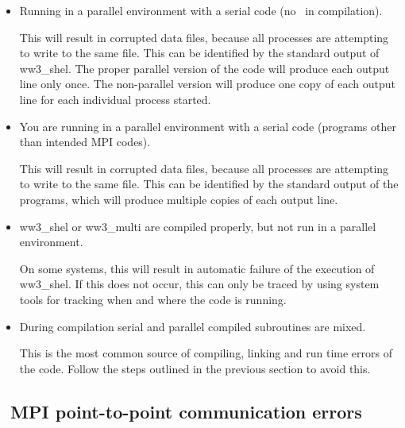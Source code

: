 \begin{itemize}
\item Running in a parallel environment with a serial code (no
      \mpi\ in compilation). \\ \vspace{-3mm}

   This will result in corrupted data files, because all processes are
   attempting to write to the same file. This can be identified by the
   standard output of {\file ww3\_shel}. The proper parallel version of the
   code will produce each output line only once. The non-parallel version will
   produce one copy of each output line for each individual process started.

\item You are running in a parallel environment with a serial code (programs
   other than intended MPI codes). \\ \vspace{-3mm}

   This will result in corrupted data files, because all processes are
   attempting to write to the same file. This can be identified by the
   standard output of the programs, which will produce multiple copies of each
   output line.

\item {\file ww3\_shel} or {\file ww3\_multi} are compiled properly, but not
   run in a parallel environment. \\ \vspace{-3mm}

   On some systems, this will result in automatic failure of the execution of
   {\code ww3\_shel}. If this does not occur, this can only be traced by
   using system tools for tracking when and where the code is running.

\item During compilation serial and parallel compiled subroutines are mixed.
      \\ \vspace{-3mm}

   This is the most common source of compiling, linking and run time errors
   of the code. Follow the steps outlined in the previous section to avoid
   this. 

\end{itemize}



\vssub
\subsection{~MPI point-to-point communication errors}
\vssub

